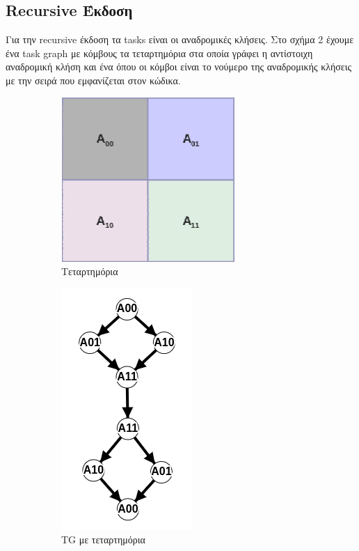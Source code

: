 \documentclass{article}
\newcommand\e[1]{\foreignlanguage{english}{#1}}
\begin{document}
\subsection{\e{Recursive} Έκδοση}
Για την \e{recursive} έκδοση τα \e{tasks} είναι οι αναδρομικές κλήσεις. Στο σχήμα 2 έχουμε ένα \e{task graph} με κόμβους τα τεταρτημόρια στα οποία γράφει η αντίστοιχη αναδρομική κλήση και ένα όπου οι κόμβοι είναι το νούμερο της αναδρομικής κλήσεις με την σειρά που εμφανίζεται στον κώδικα.
\begin{figure}[H]
\centering
\begin{subfigure}{.35\textwidth}
  \centering
  \includegraphics[width=.4\linewidth]{../3_images/recursive.png}
  \caption{Τεταρτημόρια}
  \label{fig:sub1}
\end{subfigure}%
\begin{subfigure}{.35\textwidth}
  \centering
  \includegraphics[width=.4\linewidth]{../3_images/recursivefw.png}
  \caption{\e{TG} με τεταρτημόρια}
  \label{fig:sub2}
\end{subfigure}%
\begin{subfigure}{.35\textwidth}
  \centering

\end{subfigure}
\end{figure}
\end{document}

